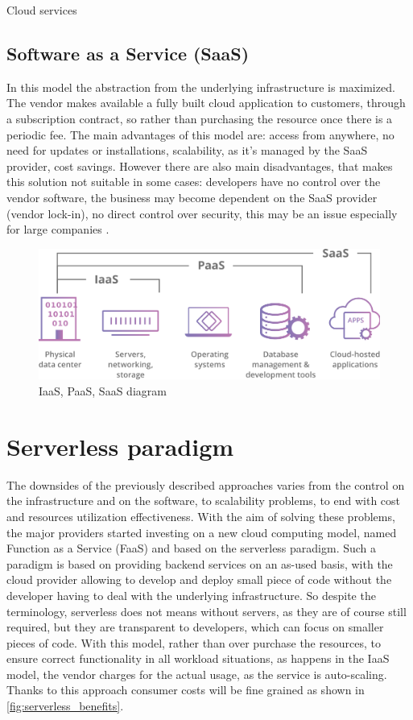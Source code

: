 \begin{chapter}{Cloud services}
    \subsection{Software as a Service (SaaS)}
    In this model the abstraction from the underlying infrastructure is maximized.
    The vendor makes available a fully built cloud application to customers, through
    a subscription contract, so rather than purchasing the resource once there is
    a periodic fee. The main advantages of this model are: access from anywhere,
    no need for updates or installations, scalability, as it's managed by the SaaS
    provider, cost savings.
    However there are also main disadvantages, that makes this solution not suitable
    in some cases: developers have no control over the vendor software, the business
    may become dependent on the SaaS provider (vendor lock-in), no direct control
    over security, this may be an issue especially for large companies \cite{saas}.

    \begin{figure}
        \centering
        \includegraphics[width=\linewidth]{source/images/saas-paas-iaas-diagram.png}
        \caption{IaaS, PaaS, SaaS diagram}
        \label{fig:cloud_computing_architectures}
    \end{figure}

    \section{Serverless paradigm}
    The downsides of the previously described approaches varies from the control on the
    infrastructure and on the software, to scalability problems, to end with cost
    and resources utilization effectiveness.
    With the aim of solving these problems, the major providers started investing on
    a new cloud computing model, named Function as a Service (FaaS) and based on the
    serverless paradigm.
    Such a paradigm is based on providing backend services on an as-used basis, with
    the cloud provider allowing to develop and deploy small piece of code without
    the developer having to deal with the underlying infrastructure.
    So despite the terminology, serverless does not means without servers, as they are
    of course still required, but they are transparent to developers, which can focus
    on smaller pieces of code.
    With this model, rather than over purchase the resources, to ensure correct
    functionality in all workload situations, as happens in the IaaS model, the vendor
    charges for the actual usage, as the service is auto-scaling. Thanks to this approach
    consumer costs will be fine grained as shown in \ref{fig:serverless_benefits}.


\end{chapter}
